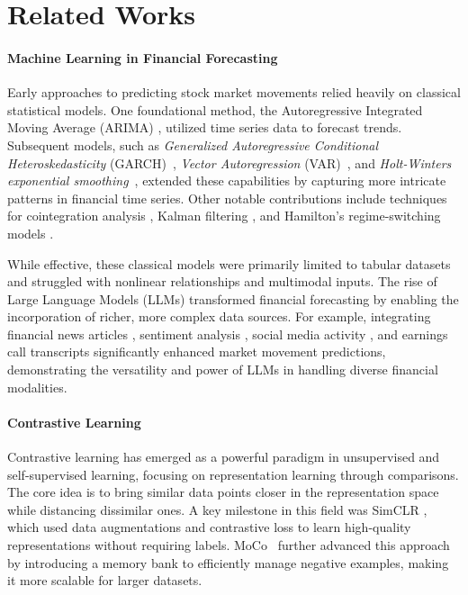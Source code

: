 \section{Related Works}
\label{sec:preliminaries}

\paragraph{Machine Learning in Financial Forecasting}
Early approaches to predicting stock market movements relied heavily on classical statistical models. One foundational method, the Autoregressive Integrated Moving Average (ARIMA) \cite{box1970time}, utilized time series data to forecast trends. Subsequent models, such as \textit{Generalized Autoregressive Conditional Heteroskedasticity} (GARCH)~\cite{bollerslev1986generalized}, \textit{Vector Autoregression} (VAR)~\cite{sims1980macroeconomics}, and \textit{Holt-Winters exponential smoothing}~\cite{holt1957forecasting}, extended these capabilities by capturing more intricate patterns in financial time series. Other notable contributions include techniques for cointegration analysis \cite{engle1987cointegration}, Kalman filtering \cite{kalman1960new}, and Hamilton’s regime-switching models \cite{hamilton1989new}.

While effective, these classical models were primarily limited to tabular datasets and struggled with nonlinear relationships and multimodal inputs. The rise of Large Language Models (LLMs) transformed financial forecasting by enabling the incorporation of richer, more complex data sources. For example, integrating financial news articles \cite{yang2020finbert}, sentiment analysis \cite{yang2020finbert}, social media activity \cite{bollen2011twitter}, and earnings call transcripts \cite{tsai2016forecasting} significantly enhanced market movement predictions, demonstrating the versatility and power of LLMs in handling diverse financial modalities.

\paragraph{Contrastive Learning} 
Contrastive learning has emerged as a powerful paradigm in unsupervised and self-supervised learning, focusing on representation learning through comparisons. The core idea is to bring similar data points closer in the representation space while distancing dissimilar ones. A key milestone in this field was SimCLR \cite{chen2020simple}, which used data augmentations and contrastive loss to learn high-quality representations without requiring labels. MoCo~\cite{he2020momentum} further advanced this approach by introducing a memory bank to efficiently manage negative examples, making it more scalable for larger datasets.

